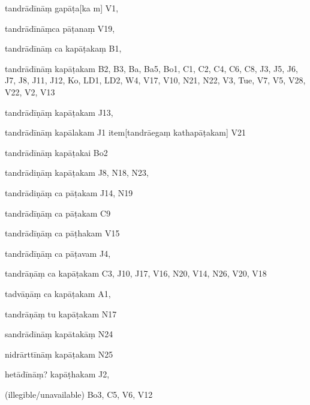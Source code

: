 \begin{ekdosis}
\begin{marma}[hp01_055]
\begin{marma}[hp02_009]
\begin{marma}[hp02_011]
      \begin{marma}[hp02_33b]
      \item[tandrādīnāṃ gapāṭa[ka]m] V1,
      \item[tandrādīnāṃca pāṭanaṃ] V19,
      \item[tandrādīnāṃ ca kapāṭakaṃ] B1,
      \item[tandrādīnāṃ kapāṭakam] B2, B3, Ba, Ba5, Bo1, C1, C2, C4, C6, C8, J3, J5, J6, J7, J8, J11, J12, Ko, LD1, LD2, W4, V17, V10, N21, N22, V3, Tue, V7, V5, V28, V22, V2, V13
      \item[tandrādīṇāṃ kapāṭakam] J13, 
      \item[tandrādīnāṃ kapālakam] J1
        item[tandrāegaṃ kathapāṭakam] V21
      \item[tandrādīnāṃ kapāṭakai] Bo2
      \item[tandrādiṇāṃ kapāṭakam] J8, N18, N23,
      \item[tandrādiṇāṃ ca pāṭakam] J14, N19
      \item[tandrādīṇāṃ ca pāṭakam] C9
      \item[tandrādīṇāṃ ca pāṭhakam] V15
      \item[tandrādīṇāṃ ca pāṭavam] J4,
      \item[tandrāṇāṃ ca kapāṭakam] C3, J10, J17, V16, N20, V14, N26, V20, V18
      \item[tadvāṇāṃ ca kapāṭakam] A1,
      \item[tandrāṇāṃ tu kapāṭakam] N17
      \item[sandrādīnāṃ kapātakāṃ] N24
      \item[nidrārttīnāṃ kapāṭakam] N25
      \item[hetādīnāṃ? kapāṭhakam] J2,
      \item[(illegible/unavailable)] Bo3, C5, V6, V12
        \begin{description}

        \end{description}
      \end{marma}


\end{marma}
\end{marma}
\end{marma}
\end{ekdosis}
